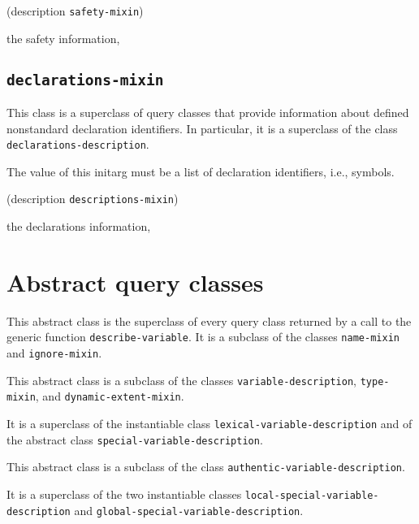 {\footnotesize
{} {(description {\tt safety-mixin})}
}

 the safety information, 

\subsection{\texttt{declarations-mixin}}
\label{sec-declarations-mixin}

{\footnotesize
{}
}

This class is a superclass of query classes that provide information
about defined nonstandard declaration identifiers. In particular, it
is a superclass of the class \texttt{declarations-description}.

{\footnotesize
{}
}

The value of this initarg must be a list of declaration identifiers,
i.e., symbols.

{\footnotesize
{} {(description {\tt descriptions-mixin})}
}

 the declarations information, 

\section{Abstract query classes}

{\footnotesize
{}
}

This abstract class is the superclass of every query class returned by
a call to the generic function \texttt{describe-variable}.  It is a
subclass of the classes \texttt{name-mixin} and \texttt{ignore-mixin}.

{\footnotesize
{}
}

This abstract class is a subclass of the classes
\texttt{variable-description}, \texttt{type-mixin}, and
\texttt{dynamic-extent-mixin}.

It is a superclass of the instantiable class
\texttt{lexical-variable-description} and of the abstract class
\texttt{special-variable-description}.

{\footnotesize
{}
}

This abstract class is a subclass of the class
\texttt{authentic-variable-description}.

It is a superclass of the two instantiable classes
\texttt{local-special-variable-description} and
\texttt{global-special-variable-description}.

